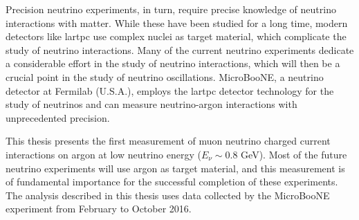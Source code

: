 Precision neutrino experiments, in turn, require precise knowledge of neutrino interactions with matter. While these have been studied for a long time, modern detectors like \acrshort{lartpc} use complex nuclei as target material, which complicate the study of neutrino interactions. Many of the current neutrino experiments dedicate a considerable effort in the study of neutrino interactions, which will then be a crucial point in the study of neutrino oscillations.
MicroBooNE, a neutrino detector at Fermilab (U.S.A.), employs the \acrshort{lartpc} detector technology for the study of neutrinos and can measure neutrino-argon interactions with unprecedented precision.

This thesis presents the first measurement of muon neutrino charged current interactions on argon at low neutrino energy ($E_\nu \sim 0.8$ GeV). Most of the future neutrino experiments will use argon as target material, and this measurement is of fundamental importance for the successful completion of these experiments. The analysis described in this thesis
uses data collected by the MicroBooNE experiment from February to October 2016.





































